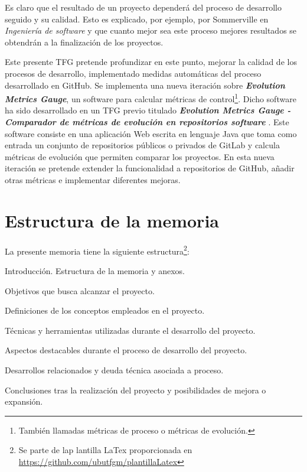 Es claro que el resultado de un proyecto dependerá del proceso de desarrollo seguido y su calidad. Esto es explicado, por ejemplo, por Sommerville en \textit{Ingeniería de software} \cite{sommerville_ingenierisoftware_2002} y que cuanto mejor sea este proceso mejores resultados se obtendrán a la finalización de los proyectos.

Este presente TFG pretende profundizar en este punto, mejorar la calidad de los procesos de desarrollo,  implementado medidas automáticas del proceso desarrollado en GitHub. Se implementa una nueva iteración sobre \textit{\textbf{Evolution Metrics Gauge}}, un software para calcular métricas de control\footnote{También llamadas métricas de proceso o métricas de evolución.}.
Dicho software ha sido desarrollado en un TFG previo titulado \textit{\textbf{Evolution Metrics Gauge - Comparador de métricas de evolución en repositorios software}} \cite{TFGPrevio}. Este software consiste en una aplicación Web escrita en lenguaje Java que toma como entrada un conjunto de repositorios públicos o privados de GitLab y calcula métricas de evolución que permiten comparar los proyectos.
En esta nueva iteración se pretende extender la funcionalidad a repositorios de GitHub, añadir otras métricas e implementar diferentes mejoras.




\section{Estructura de la memoria}

La presente memoria tiene la siguiente estructura\footnote{Se parte de lap lantilla LaTex proporcionada en \url{https://github.com/ubutfgm/plantillaLatex}}:

\begin{description}
	\tightlist
	\item[Introducción.] Introducción. Estructura de la memoria y anexos.
	\item[Objetivos del proyecto.] Objetivos que busca alcanzar el proyecto.
	\item[Conceptos teóricos.] Definiciones de los conceptos empleados en el proyecto.
	\item[Técnicas y herramientas.] Técnicas y herramientas utilizadas durante el desarrollo del proyecto.
	\item[Aspectos relevantes del desarrollo.] Aspectos destacables durante el proceso de desarrollo del proyecto.
	\item[Trabajos relacionados y \textit{debt process}.] Desarrollos relacionados y deuda técnica asociada a proceso.
	\item[Conclusiones y líneas de trabajo futuras.] Conclusiones tras la realización del proyecto y posibilidades de mejora o expansión.
\end{description}

